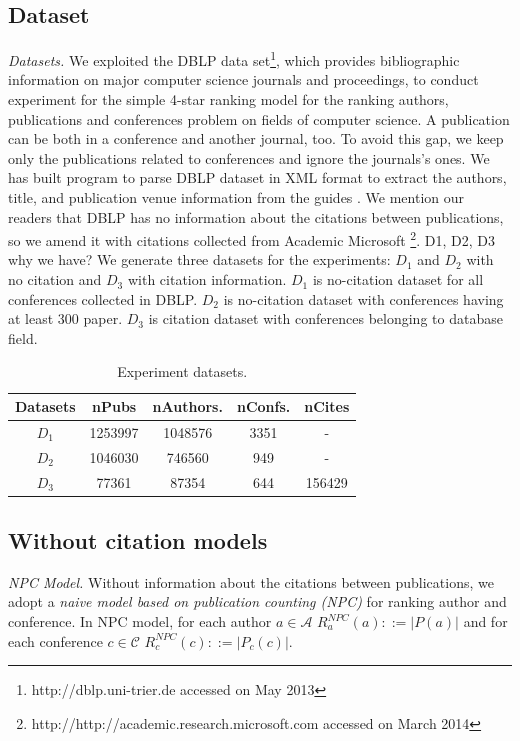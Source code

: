 \documentclass[10pt,leqno,twoside]{article}
\begin{document}
\subsection{Dataset}
\textit{Datasets.} We exploited the DBLP data set\footnote{http://dblp.uni-trier.de accessed on May 2013}, which provides bibliographic information on major computer science journals and proceedings,  to conduct experiment for the simple 4-star ranking model for the ranking authors, publications and conferences problem on fields of computer science.  A publication can be both in a conference and another journal, too.  To avoid this gap, we keep only the publications related to conferences and ignore the journals's ones. We has built program to parse DBLP dataset in XML format to extract the authors, title, and publication venue information from the guides \cite{MichaelLey06,MichaelLey09}.  We mention our readers that DBLP has no information about the citations between publications, so we amend it with citations collected from Academic Microsoft \footnote{http://http://academic.research.microsoft.com accessed on March 2014}.  
D1, D2, D3 why we have? 
We generate three datasets for the experiments: $D_1$ and $D_2$ with no citation and $D_3$ with citation information. $D_1$ is no-citation dataset for all conferences collected in DBLP. $D_2$ is no-citation dataset with conferences having at least 300 paper. $D_3$ is citation dataset with conferences belonging to database field.
\begin{center}
\begin{table}
	\centering 
	\caption{Experiment datasets.}
    \label{Tab:Dataset}
    \begin{tabular}{|c|c|c|c|c|}
    \hline
    \textbf{Datasets} & \textbf{nPubs} & \textbf{nAuthors. } & \textbf{nConfs.} & \textbf{nCites} \\ \hline
   $D_1$ & 1253997 & 1048576 & 3351 & - \\
   $D_2$ & 1046030 & 746560 & 949 & - \\
   $D_3$ & 77361 & 87354 & 644 & 156429 \\
    \hline
    \end{tabular}
\end{table}
\end{center}

\subsection{Without citation models}
\textit{NPC Model.} Without information about the citations between publications, we adopt a \textit{naive model based on publication counting (NPC)} for ranking author and conference. In NPC model, for each author $a \in \mathcal{A}$  $R^{NPC}_a(a) ::= |P(a)| $ and for each conference $c \in \mathcal{C}$  $R^{NPC}_c(c) ::= |P_c(c)|$.
\end{document}
